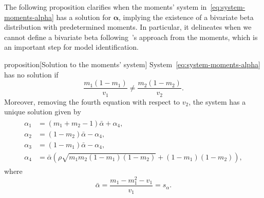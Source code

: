 \documentclass[a4paper, notitlepage, 10pt]{article}
\theoremstyle{definition}
\begin{document}
The following proposition clarifies when the moments' system in~\eqref{eq:system-moments-alpha} has a solution for $\boldsymbol{\alpha}$, implying the existence of a bivariate beta distribution with predetermined moments. 
In particular, it delineates when we cannot define a bivariate beta following~\citeauthor{olkin2015constructions}'s approach from the moments, which is an important step for model identification.

\begin{theoremEnd}{proposition}[Solution to the moments' system]\label{prop:solution-to-system-bivariate-beta}
    System~\eqref{eq:system-moments-alpha} has no solution if
    \begin{equation}
        \label{eq:inequality-bivariate-beta}
        \frac{m_1(1-m_1)}{v_1} \neq \frac{m_2(1-m_2)}{v_2}.
    \end{equation}
    Moreover, removing the fourth equation with respect to $v_2$, the system has a unique solution given by 
    \begin{gather}\label{eq:system-solution}
    \begin{aligned}
    \alpha_1 &= (m_1 + m_2 - 1)\bar{\alpha} + \alpha_4, \\
    \alpha_2 &=  (1 - m_2)\bar{\alpha} - \alpha_4, \\
    \alpha_3 &= (1-m_1)\bar{\alpha} - \alpha_4, \\
    \alpha_4 &= \bar{\alpha}\left(\rho\sqrt{m_1m_2(1-m_1)(1-m_2)} + (1-m_1)(1-m_2)\right),
    \end{aligned}
    \end{gather}
    where
    \begin{equation}
        \label{eq:sum-alpha-solution}
        \bar{\alpha} = \frac{m_1 - m_1^2 - v_1}{v_1} = s_{\alpha}.
    \end{equation}
\end{theoremEnd}
\end{document}
